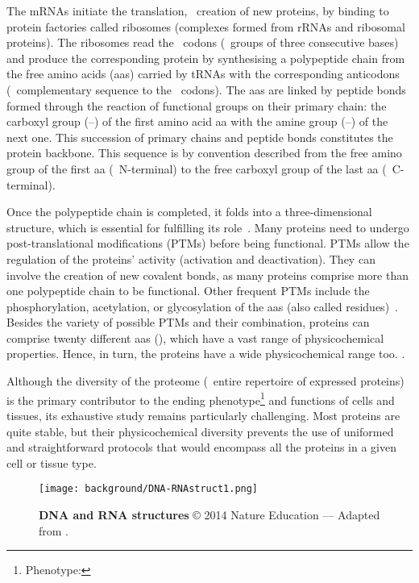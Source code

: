 The \glspl{mRNA} initiate the translation,
\ie\ creation of new proteins,
by binding to protein factories called ribosomes
(complexes formed from \glspl{rRNA} and ribosomal proteins).
The ribosomes read the \mRNA\ codons (\ie\ groups of three consecutive bases)
and produce the corresponding protein by synthesising a polypeptide chain
from the free amino acids (\glspl{aa}) carried by \glspl{tRNA}
with the corresponding anticodons (\ie\ complementary sequence to the \mRNA\ codons).
The \glspl{aa} are linked by peptide bonds formed
through the reaction of functional groups on their primary chain:
the carboxyl group (--) of the first amino acid \gls{aa}
with the amine group (--) of the next one.
This succession of primary chains and peptide bonds constitutes
the protein backbone.
This sequence is by convention described
from the free amino group of the first \gls{aa} (\ie\ N-terminal)
to the free carboxyl group of the last \gls{aa} (\ie\ C-terminal).

Once the polypeptide chain is completed,
it folds into a three-dimensional structure,
which is essential for fulfilling its role~.
Many proteins need to undergo post-translational modifications (\glspl{PTM})
before being functional.
\glspl{PTM} allow the regulation of the proteins' activity
(activation and deactivation).
They can involve the creation of new covalent bonds,
as many proteins comprise more than one polypeptide chain to be functional.
Other frequent \glspl{PTM} include the phosphorylation, acetylation,
or glycosylation of the \glspl{aa} (also called residues)~.
Besides the variety of possible \glspl{PTM} and their combination,
proteins can comprise twenty different \glspl{aa} (),
which have a vast range of physicochemical properties.
Hence, in turn, the proteins have a wide physicochemical range too.
.

Although the diversity of the proteome
(\ie\ entire repertoire of expressed proteins)
is the primary contributor to
the ending \gls{phenotype}\footnote{Phenotype: }
and functions of cells and tissues,
its exhaustive study remains particularly challenging.
Most proteins are quite stable,
but their physicochemical diversity prevents
the use of uniformed and straightforward protocols
that would encompass all the proteins
in a given cell or tissue type.~

\begin{figure}[!htbp]
    \texttt{[image: background/DNA-RNAstruct1.png]}\centering
    \vspace{-2mm}
    \caption[DNA and RNA structures]{\label{fig:DNARNAstruct}%
    \textbf{DNA and RNA structures} © 2014 Nature Education ---
    Adapted from \citet{Pierce2005-ib}.}
\end{figure}

